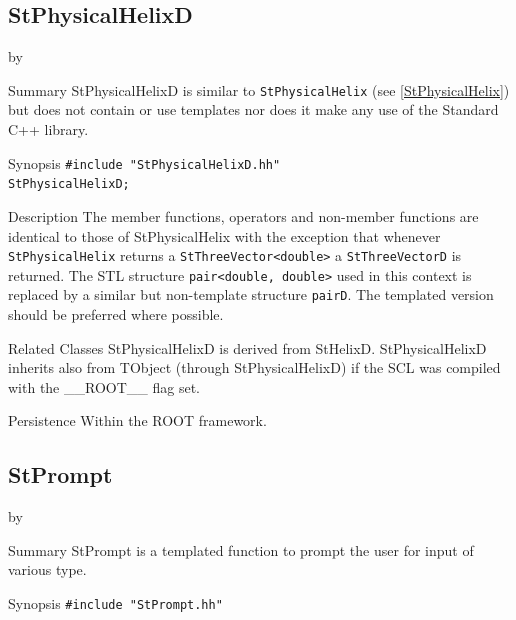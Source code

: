 \documentclass[twoside]{article}
\newcommand{\name}[1]{\textsf{#1}}%
\newcommand{\entrylabel}[1]{\mbox{\textbf{{#1}}}\hfil}%
\newenvironment{entry}
{\begin{list}{}%
    {\renewcommand{\makelabel}{\entrylabel}%
     \setlength{\labelwidth}{90pt}%
     \setlength{\leftmargin}{\labelwidth}
     \advance\leftmargin by \labelsep%
      }%
    }%
  {\end{list}}
\newcommand{\Entrylabel}[1]%
{\raisebox{0pt}[1ex][0pt]{\makebox[\labelwidth][l]%
    {\parbox[t]{\labelwidth}{\hspace{0pt}\textbf{{#1}}}}}}
\newenvironment{Entry}%
{\renewcommand{\entrylabel}{\Entrylabel}\begin{entry}}%
  {\end{entry}}
\begin{document}
\begin{description}
\subsection{StPhysicalHelixD } \label{StPhysicalHelixD}
\begin{Entry}
\item[Summary]
    StPhysicalHelixD is similar to \texttt{StPhysicalHelix}
    (see \ref{StPhysicalHelix}) but does not contain or use templates nor
    does it make any use of the Standard C++ library. 
    
\item[Synopsis]
    \verb+#include "StPhysicalHelixD.hh"+ \\
    \verb+StPhysicalHelixD;+
    
    
\item[Description]       
    The member functions, operators and non-member functions are identical
    to those of StPhysicalHelix with the exception that whenever \texttt{StPhysicalHelix} returns a
    \verb+StThreeVector<double>+ a \texttt{StThreeVectorD} is returned.
    The STL structure \verb+pair<double, double>+ used in this context is replaced
    by a similar but non-template structure \texttt{pairD}. 
    The templated version should be preferred where possible.

\item[Related Classes]
    StPhysicalHelixD is derived from StHelixD.
    StPhysicalHelixD inherits also from TObject (through StPhysicalHelixD) 
    if the SCL was compiled with the \name{\_\_ROOT\_\_} flag set.
    
\item[Persistence]
    Within the ROOT framework.

\end{Entry}


\clearpage

%
%
\subsection{StPrompt } \label{ref:StPrompt}
\begin{Entry}
\item[Summary]
    StPrompt is a templated function to prompt the user for input of
    various type.
    
\item[Synopsis]
    \verb+#include "StPrompt.hh"+
    

\end{Entry}
\end{description}
\end{document}
